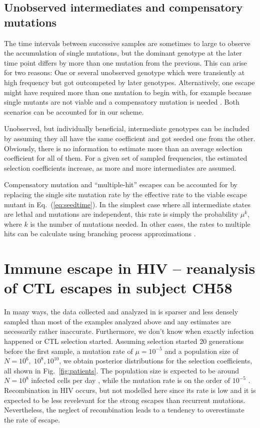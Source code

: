 \documentclass[rmp,twocolumn]{revtex4}
\newcommand{\EQ}[1]{Eq.~(\ref{eq:#1})}
\newcommand{\FIG}[1]{Fig.~\ref{fig:#1}}
\begin{document}
\subsection*{Unobserved intermediates and compensatory mutations}
The time intervals between successive samples are sometimes to large to observe
the accumulation of single mutations, but the dominant genotype at the later
time point differs by more than one mutation from the previous. This can arise
for two reasons: One or several unobserved genotype which were transiently at
high frequency but got outcompeted by later genotypes. Alternatively, one escape
might have required more than one mutation to begin with, for example because
single mutants are not viable and a compensatory mutation is needed
\citep{read_stochastic_2012}. Both scenarios can be accounted for in our scheme. 

Unobserved, but individually beneficial, intermediate genotypes can be included
by assuming they all have the same coefficient and got seeded one from the
other. Obviously, there is no information to estimate more than an average
selection coefficient for all of them. For a given set of sampled frequencies,
the estimated selection coefficients increase, as more and more intermediates
are assumed.

Compensatory mutation and ``multiple-hit'' escapes can be accounted for by
replacing the single site mutation rate by the effective rate to the viable
escape mutant in \EQ{seedtime}. In the simplest case where all intermediate
states are lethal and mutations are independent, this rate is simply the probability $\mu^k$,
where $k$ is the number of mutations needed. In other cases, the rates to
multiple hits can be calculate using branching process approximations
\citep{Weissman:2009p23398,Neher:2011p42539}.



\section*{Immune escape in HIV -- reanalysis of CTL escapes in subject CH58}
In many ways, the data collected and analyzed in
\citep{SalazarGonzalez:2009p35091,Ganusov:2011p43139} is sparser and less
densely sampled than most of the examples analyzed above and any estimates are
necessarily rather inaccurate. Furthermore, we don't know when exactly infection
happened or CTL selection started. Assuming selection started 20 generations
before the first sample, a mutation rate of $\mu=10^{-5}$ and a population size
of $N=10^6, \;10^8, 10^{10}$, we obtain posterior distributions for the
selection coefficients, all shown in \FIG{patients}. The population size is
expected to be around $N=10^8$ infected cells per day
\citep{Perelson:1996p23158}, while the mutation rate is on the order of
$10^{-5}$ \citep{Mansky:1995p38971}. Recombination in HIV occurs, but not
modelled here since its rate is low \citep{Neher:2010p32691,Batorsky:2011p40107}
and it is expected to be less revelevant for the strong escapes than recurrent
mutations. Nevertheless, the neglect of recombination leads to a tendency to
overestimate the rate of escape.
\end{document}
